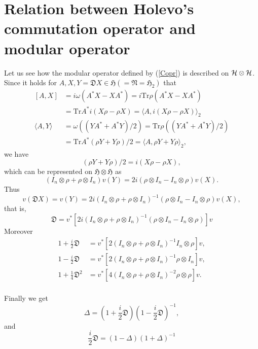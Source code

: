 \section{Relation between Holevo's commutation operator and modular operator}

Let us see how the modular operator defined by  (\ref{Copr}) is described on $\cal{H}\otimes \cal{H}$.
Since it holds for $A,X,Y=\mathfrak{D}X\in \mathfrak{H}(=\mathfrak{N}=\mathfrak{H}_2)$
that 
 \begin{equation}
 \begin{split}
 [A,X]&=i\omega(A^\ast X-XA^\ast)=i\mbox{Tr}\rho(A^\ast X-XA^\ast)\\
      &=\mbox{Tr}A^\ast i(X\rho-\rho X)=\langle A, i(X\rho-\rho X)\rangle_2\\
 \langle A,Y\rangle&=\omega((YA^\ast+A^\ast Y)/2)=\mbox{Tr}\rho((YA^\ast+A^\ast Y)/2)\\
 &=\mbox{Tr}A^\ast(\rho Y+Y\rho)/2=\langle A, \rho Y+Y\rho \rangle_2,
 \end{split}
 \end{equation}
  we have
 $$
 (\rho Y+Y\rho)/2=i(X\rho-\rho X),
 $$
 which can be represented on $\mathfrak{H}\otimes \mathfrak{H}$ as
	$$
	(I_n\otimes \rho + \rho\otimes I_n)v(Y)=2i(\rho\otimes I_n -I_n\otimes \rho )v(X).
	$$
	Thus 
	$$
	v(\mathfrak{D}X)=v(Y)=2i(I_n\otimes \rho + \rho\otimes I_n)^{-1}(\rho\otimes I_n -I_n\otimes \rho )v(X),
	$$
	that is,
	$$
	\mathfrak{D}=v^\ast[ 2i(I_n\otimes \rho + \rho\otimes I_n)^{-1}(\rho\otimes I_n -I_n\otimes \rho )]v
	$$
	  Moreover
	\begin{equation}
		\begin{split}
    1+\frac{i}{2}\mathfrak{D}&=v^\ast [ 2(I_n\otimes \rho+\rho\otimes I_n)^{-1}  I_n\otimes \rho]v,\\
    1-\frac{i}{2}\mathfrak{D}&=v^\ast [ 2(I_n\otimes \rho+\rho\otimes I_n)^{-1}\rho \otimes I_n]v,\\
    1+\frac{1}{4}\mathfrak{D}^2&=v^\ast[ 4(I_n\otimes \rho+\rho\otimes I_n)^{-2}\rho \otimes \rho]v.\\
    \end{split}
	\end{equation}

	Finally	we get
		$$
    \Delta=\left(1+\frac{i}{2}\mathfrak{D}\right)\left(1-\frac{i}{2}\mathfrak{D}\right)^{-1},
		$$
		and
		$$
     \frac{i}{2}\mathfrak{D}=(1-\Delta)(1+\Delta)^{-1}
		$$

